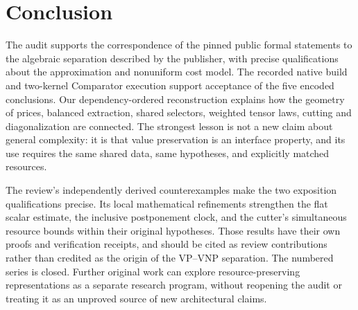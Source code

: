 \documentclass[11pt,letterpaper]{article}
\theoremstyle{definition}\newtheorem{definition}[theorem]{Definition}\newtheorem{example}[theorem]{Example}
\theoremstyle{remark}\newtheorem{remark}[theorem]{Remark}
\begin{document}
\section{Conclusion}\label{sec:conclusion}
The audit supports the correspondence of the pinned public formal statements to the algebraic separation described by the publisher, with precise qualifications about the approximation and nonuniform cost model. The recorded native build and two-kernel Comparator execution support acceptance of the five encoded conclusions. Our dependency-ordered reconstruction explains how the geometry of prices, balanced extraction, shared selectors, weighted tensor laws, cutting and diagonalization are connected. The strongest lesson is not a new claim about general complexity: it is that value preservation is an interface property, and its use requires the same shared data, same hypotheses, and explicitly matched resources.

The review's independently derived counterexamples make the two exposition qualifications precise. Its local mathematical refinements strengthen the flat scalar estimate, the inclusive postponement clock, and the cutter's simultaneous resource bounds within their original hypotheses. Those results have their own proofs and verification receipts, and should be cited as review contributions rather than credited as the origin of the VP--VNP separation. The numbered series is closed. Further original work can explore resource-preserving representations as a separate research program, without reopening the audit or treating it as an unproved source of new architectural claims.
\end{document}
